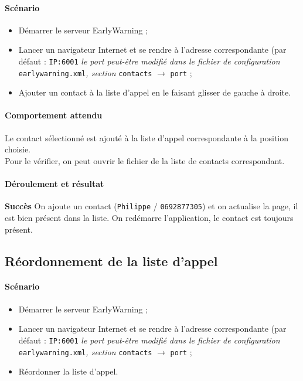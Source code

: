 \documentclass{article}
\begin{document}
\paragraph{Scénario}

\begin{itemize}
    \item Démarrer le serveur EarlyWarning ;
    \item Lancer un navigateur Internet et se rendre à l'adresse correspondante (par défaut : \texttt{IP:6001} \textit{le port peut-être modifié dans le fichier de configuration} \texttt{earlywarning.xml}\textit{, section} \texttt{contacts} $\rightarrow$ \texttt{port} ;
    \item Ajouter un contact à la liste d'appel en le faisant glisser de gauche à droite.
\end{itemize}

\paragraph{Comportement attendu\\}

Le contact sélectionné est ajouté à la liste d'appel correspondante à la position choisie.\\
Pour le vérifier, on peut ouvrir le fichier de la liste de contacts correspondant.

\paragraph{Déroulement et résultat\\} 

\textbf{Succès} On ajoute un contact (\texttt{Philippe} / \texttt{0692877305}) et on actualise la page, il est bien présent dans la liste. On redémarre l'application, le contact est toujours présent.

\subsection{Réordonnement de la liste d'appel}

\paragraph{Scénario}

\begin{itemize}
    \item Démarrer le serveur EarlyWarning ;
    \item Lancer un navigateur Internet et se rendre à l'adresse correspondante (par défaut : \texttt{IP:6001} \textit{le port peut-être modifié dans le fichier de configuration} \texttt{earlywarning.xml}\textit{, section} \texttt{contacts} $\rightarrow$ \texttt{port} ;
    \item Réordonner la liste d'appel.
\end{itemize}
\end{document}
